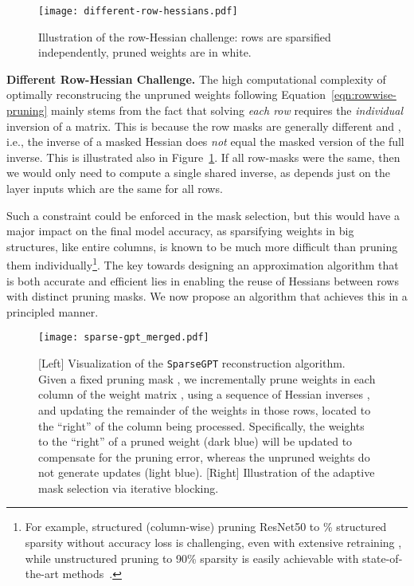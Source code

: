 \documentclass{article}
\theoremstyle{plain}
\theoremstyle{definition}
\theoremstyle{remark}
\renewcommand{\paragraph}[1]{\vspace{-0.1em} \noindent \textbf{#1}}
\newcommand{\sparsegpt}[1]{\texttt{SparseGPT}}
\begin{document}
\begin{figure}
  \begin{center}
    \texttt{[image: different-row-hessians.pdf]}
  \end{center}
  \vspace{-10pt}
      \caption{Illustration of the row-Hessian challenge: rows are sparsified independently, pruned weights are in white.}
    \label{fig:different-row-hessians}
\end{figure}

\paragraph{Different Row-Hessian Challenge.} The high computational complexity of optimally reconstrucing the unpruned weights following Equation~\ref{eqn:rowwise-pruning} mainly stems from the fact that solving \emph{each row} requires the \emph{individual} inversion of a  matrix. This is because the row masks  are generally different and , i.e., the inverse of a masked Hessian does \emph{not} equal the masked version of the full inverse. This is illustrated also in Figure~\ref{fig:different-row-hessians}. If all row-masks were the same, then we would only need to compute a single shared inverse, as  depends just on the layer inputs which are the same for all rows. 

Such a constraint could be enforced in the mask selection, but this would have a major impact on the final model accuracy, as sparsifying weights in big structures, like entire columns, is known to be much more difficult than pruning them individually\footnote{For example, structured (column-wise) pruning ResNet50 to \% structured sparsity without accuracy loss is challenging, even with extensive retraining \cite{liu2021group}, while  unstructured pruning to 90\% sparsity is easily achievable with state-of-the-art methods~\cite{evci2020rigging, peste2021ac}.}. The key towards designing an approximation algorithm that is both accurate and efficient lies in enabling the reuse of Hessians between rows with distinct pruning masks. We now propose an algorithm that achieves this in a principled manner.

\begin{figure*}[h]
    \centering
    \texttt{[image: sparse-gpt\_merged.pdf]}
    \vspace{-5pt}
    \caption{[Left] Visualization of the \sparsegpt{} reconstruction algorithm. Given a fixed pruning mask , we incrementally prune weights in each column of the weight matrix , using a sequence of Hessian inverses , and updating the remainder of the weights in those rows, located to the ``right'' of the column being processed. Specifically, the weights to the ``right'' of a pruned weight (dark blue) will be updated to compensate for the pruning error, whereas the unpruned weights do not generate updates (light blue). [Right] Illustration of the adaptive mask selection via iterative blocking.}
    \label{fig:sparse-gpt-vis}
\end{figure*}
\end{document}
